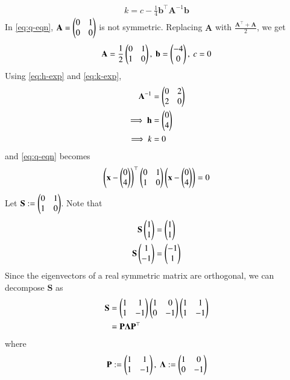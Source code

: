 \documentclass[journal,12pt,twocolumn]{IEEEtran}
\renewcommand{\vec}[1]{\boldsymbol{\mathbf{#1}}}
\begin{document}
\begin{enumerate}
\begin{align}
        k = c - \frac{1}{4}\vec{b}^\top\vec{A}^{-1}\vec{b}
        \label{eq:k-exp}
    \end{align}
    In \eqref{eq:q-eqn}, $\vec{A} = \myvec{0&1\\0&0}$ is not symmetric.
    Replacing $\vec{A}$ with $\frac{\vec{A}^\top + \vec{A}}{2}$, we get
    \begin{align}
        \vec{A} = \frac{1}{2}\myvec{0&1\\1&0},\ \vec{b} = \myvec{-4\\0},\ c = 0
        \label{eq:vals}
    \end{align}
    Using \eqref{eq:h-exp} and \eqref{eq:k-exp},
    \begin{align}
        \vec{A}^{-1} &= \myvec{0&2\\2&0} \\
        \implies \vec{h} &= \myvec{0\\4} \\
        \implies k &= 0
        \label{eq:hk-vals}
    \end{align}
    and \eqref{eq:q-eqn} becomes
    \begin{align}
        \brak{\vec{x}-\myvec{0\\4}}^\top\myvec{0&1\\1&0}\brak{\vec{x}-\myvec{0\\4}} = 0
        \label{eq:qA-diag}
    \end{align}
    Let $\vec{S} := \myvec{0&1\\1&0}$. Note that
    \begin{align}
        \vec{S}\myvec{1\\1} &= \myvec{1\\1} \label{eq:v1} \\
        \vec{S}\myvec{1\\-1} &= \myvec{-1\\1} \label{eq:v2}
    \end{align}
    Since the eigenvectors of a real symmetric matrix are orthogonal, we can 
    decompose $\vec{S}$ as
    \begin{align}
        \vec{S} &= \myvec{1&1\\1&-1}\myvec{1&0\\0&-1}\myvec{1&1\\1&-1} \\
                &= \vec{P\Lambda P}^\top
                \label{eq:S-decomp}
    \end{align}
    where
    \begin{align}
        \vec{P} := \myvec{1&1\\1&-1},\ \vec{\Lambda} := \myvec{1&0\\0&-1}

\end{align}
\end{enumerate}
\end{document}
